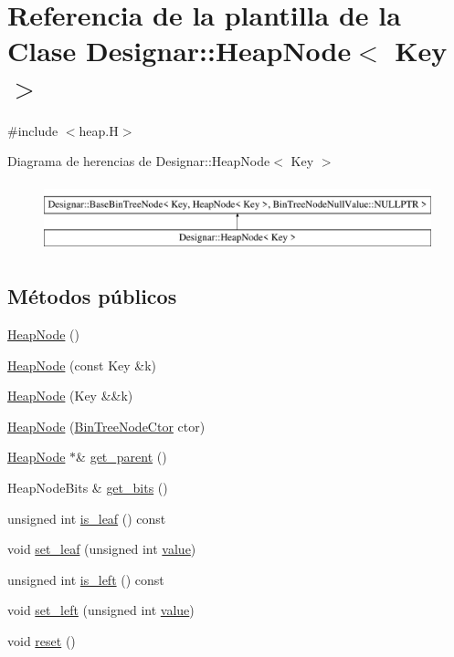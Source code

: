 \hypertarget{class_designar_1_1_heap_node}{}\section{Referencia de la plantilla de la Clase Designar\+:\+:Heap\+Node$<$ Key $>$}
\label{class_designar_1_1_heap_node}


{\ttfamily \#include $<$heap.\+H$>$}

Diagrama de herencias de Designar\+:\+:Heap\+Node$<$ Key $>$\begin{figure}[H]
\begin{center}
\leavevmode
\includegraphics[height=2.000000cm]{class_designar_1_1_heap_node}
\end{center}
\end{figure}
\subsection*{Métodos públicos}
\begin{DoxyCompactItemize}
\item 
\hyperlink{class_designar_1_1_heap_node_ae38c08903f2c52e19c71d392661893f2}{Heap\+Node} ()
\item 
\hyperlink{class_designar_1_1_heap_node_ac5b4c9acb233f72e70b0dc3f4a46e3b5}{Heap\+Node} (const Key \&k)
\item 
\hyperlink{class_designar_1_1_heap_node_a29189c1b5cd10290c2332e40cadbb899}{Heap\+Node} (Key \&\&k)
\item 
\hyperlink{class_designar_1_1_heap_node_aa4287eba82bce2dae37c5e3f4012b1b4}{Heap\+Node} (\hyperlink{namespace_designar_a679bc99fd69a3601faa5d6d47f865106}{Bin\+Tree\+Node\+Ctor} ctor)
\item 
\hyperlink{class_designar_1_1_heap_node}{Heap\+Node} $\ast$\& \hyperlink{class_designar_1_1_heap_node_aacf1d59ac7645a1fe6479f93957dc1be}{get\+\_\+parent} ()
\item 
Heap\+Node\+Bits \& \hyperlink{class_designar_1_1_heap_node_a9fc6866e2550f415ec407b1c85ca54ab}{get\+\_\+bits} ()
\item 
unsigned int \hyperlink{class_designar_1_1_heap_node_ad0b5b06b0126cdd711970709c4fb2187}{is\+\_\+leaf} () const
\item 
void \hyperlink{class_designar_1_1_heap_node_a34ec910a7402b356d7b3d67200f794ec}{set\+\_\+leaf} (unsigned int \hyperlink{namespace_designar_a7dd2a7b6d96f664ce612b506c8eb2fb8}{value})
\item 
unsigned int \hyperlink{class_designar_1_1_heap_node_a778fa64fe1c4221eb7833cfb68713332}{is\+\_\+left} () const
\item 
void \hyperlink{class_designar_1_1_heap_node_a65a5b3a38d152072e756182600502d93}{set\+\_\+left} (unsigned int \hyperlink{namespace_designar_a7dd2a7b6d96f664ce612b506c8eb2fb8}{value})
\item 
void \hyperlink{class_designar_1_1_heap_node_a60340ca59bc0968899e960bc9d1b08b3}{reset} ()
\end{DoxyCompactItemize}
